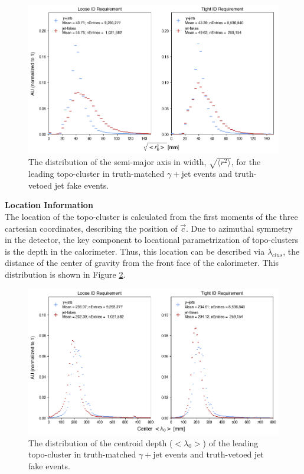 \begin{figure}[t]
    \centering 
    \includegraphics[width=\textwidth]{chapters/chapter4_photonID/images/hists/y_topoCluster0_secondR.png}
    \caption[The distribution of the semi-major axis in width, $\sqrt{\langle r^2 \rangle}$, for the leading topo-cluster]{The distribution of the semi-major axis in width, $\sqrt{\langle r^2 \rangle}$, for the leading topo-cluster in truth-matched $\gamma+$jet events and truth-vetoed jet fake events.}
    \label{fig:topo-secondR}
\end{figure}



\noindent\textbf{Location Information}\\
\indent The location of the topo-cluster is calculated from the first moments of the three cartesian coordinates, describing the position of $\vec{c}$. Due to azimuthal symmetry in the detector, the key component to locational parametrization of topo-clusters is the depth in the calorimeter. Thus, this location can be described via $\lambda_{clus}$, the distance of the center of gravity from the front face of the calorimeter. This distribution is shown in Figure \ref{fig:topo-centerLambda}.

\begin{figure}
    \centering 
    \includegraphics[width=\textwidth]{chapters/chapter4_photonID/images/hists/y_topoCluster0_centerLambda.png}
    \caption[The distribution of the centroid depth ($<\lambda_{0}>$) of the leading topo-cluster]{The distribution of the centroid depth ($<\lambda_{0}>$) of the leading topo-cluster in truth-matched $\gamma+$jet events and truth-vetoed jet fake events.}
    \label{fig:topo-centerLambda}
\end{figure}

